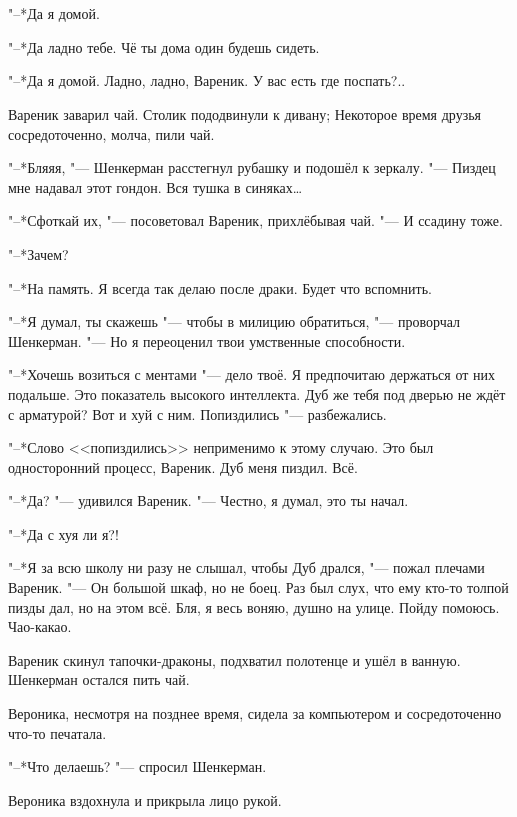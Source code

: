 \chapter{}

\label{Sun_2012_07_22}

"--*Да я домой.

"--*Да ладно тебе.
Чё ты дома один будешь сидеть.

"--*Да я домой.
Ладно, ладно, Вареник.
У вас есть где поспать?..

Вареник заварил чай.
Столик пододвинули к дивану;
Некоторое время друзья сосредоточенно, молча, пили чай.

"--*Бляяя, "--- Шенкерман расстегнул рубашку и подошёл к зеркалу.
"--- Пиздец мне надавал этот гондон.
Вся тушка в синяках\ldots{}

"--*Сфоткай их, "--- посоветовал Вареник, прихлёбывая чай.
"--- И ссадину тоже.

"--*Зачем?

"--*На память.
Я всегда так делаю после драки.
Будет что вспомнить.

"--*Я думал, ты скажешь "--- чтобы в милицию обратиться, "--- проворчал Шенкерман.
"--- Но я переоценил твои умственные способности.

"--*Хочешь возиться с ментами "--- дело твоё.
Я предпочитаю держаться от них подальше.
Это показатель высокого интеллекта.
Дуб же тебя под дверью не ждёт с арматурой?
Вот и хуй с ним.
Попиздились "--- разбежались.

"--*Слово <<попиздились>> неприменимо к этому случаю.
Это был односторонний процесс, Вареник.
Дуб меня пиздил.
Всё.

"--*Да? "--- удивился Вареник.
"--- Честно, я думал, это ты начал.

"--*Да с хуя ли я?!

"--*Я за всю школу ни разу не слышал, чтобы Дуб дрался, "--- пожал плечами Вареник.
"--- Он большой шкаф, но не боец.
Раз был слух, что ему кто-то толпой пизды дал, но на этом всё.
Бля, я весь воняю, душно на улице.
Пойду помоюсь.
Чао-какао.

Вареник скинул тапочки-драконы, подхватил полотенце и ушёл в ванную.
Шенкерман остался пить чай.

Вероника, несмотря на позднее время, сидела за компьютером и сосредоточенно что-то печатала.

"--*Что делаешь? "--- спросил Шенкерман.

Вероника вздохнула и прикрыла лицо рукой.

